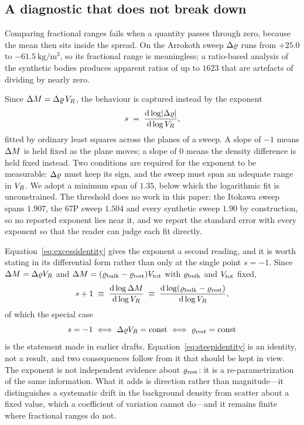 \subsection{A diagnostic that does not break down}
\label{sec:constrains:slope}

Comparing fractional ranges fails when a quantity passes through zero,
because the mean then sits inside the spread. On the Arrokoth sweep
$\Delta\varrho$ runs from $+25.0$ to $\SI{-61.5}{\kilo\gram\per\cubic\metre}$, so
its fractional range is meaningless; a ratio-based analysis of the synthetic
bodies produces apparent ratios of up to $1623$ that are artefacts of
dividing by nearly zero.

Since $\Delta M = \Delta\varrho\,V_{R}$, the behaviour is captured instead by the
exponent
%
\begin{equation}
s \;=\; \frac{\mathrm{d}\log\lvert\Delta\varrho\rvert}{\mathrm{d}\log V_{R}} ,
\label{eq:slope}
\end{equation}
%
fitted by ordinary least squares across the planes of a sweep. A slope of
$-1$ means $\Delta M$ is held fixed as the plane moves; a slope of $0$ means
the density difference is held fixed instead. Two conditions are required
for the exponent to be measurable: $\Delta\varrho$ must keep its sign, and the
sweep must span an adequate range in $V_{R}$. We adopt a minimum span of
$1.35$, below which the logarithmic fit is unconstrained. The threshold
does no work in this paper: the Itokawa sweep spans $1.907$, the 67P sweep
$1.504$ and every synthetic sweep $1.90$ by construction, so no reported
exponent lies near it, and we report the standard error with every
exponent so that the reader can judge each fit directly.

Equation~\eqref{eq:excessidentity} gives the exponent a second reading, and
it is worth stating in its differential form rather than only at the single
point $s=-1$. Since $\Delta M = \Delta\varrho V_{R}$ and
$\Delta M = (\varrho_{\mathrm{bulk}} - \varrho_{\mathrm{rest}})V_{\mathrm{tot}}$ with $\varrho_{\mathrm{bulk}}$ and $V_{\mathrm{tot}}$ fixed,
%
\begin{equation}
s + 1 \;\equiv\; \frac{\mathrm{d}\log\Delta M}{\mathrm{d}\log V_{R}}
      \;\equiv\; \frac{\mathrm{d}\log\!\left(\varrho_{\mathrm{bulk}}-\varrho_{\mathrm{rest}}\right)}
                      {\mathrm{d}\log V_{R}} ,
\label{eq:steepidentity}
\end{equation}
%
of which the special case
%
\begin{equation}
s = -1 \iff \Delta\varrho V_{R} = \mathrm{const} \iff \varrho_{\mathrm{rest}} = \mathrm{const}
\label{eq:slopeequiv}
\end{equation}
%
is the statement made in earlier drafts. Equation~\eqref{eq:steepidentity}
is an identity, not a result, and two consequences follow from it that
should be kept in view. The exponent is not independent evidence about
$\varrho_{\mathrm{rest}}$: it is a re-parametrization of the same information. What it
adds is direction rather than magnitude---it distinguishes a systematic
drift in the background density from scatter about a fixed value, which a
coefficient of variation cannot do---and it remains finite where fractional
ranges do not.

